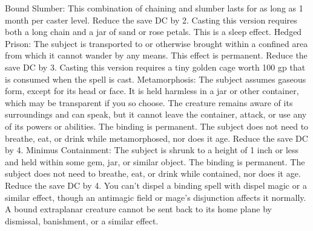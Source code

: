 {Bound Slumber: This combination of chaining and slumber lasts for as long as 1 month per caster level. Reduce the save DC by 2. Casting this version requires both a long chain and a jar of sand or rose petals. This is a sleep effect.
Hedged Prison: The subject is transported to or otherwise brought within a confined area from which it cannot wander by any means. This effect is permanent. Reduce the save DC by 3. Casting this version requires a tiny golden cage worth 100 gp that is consumed when the spell is cast.
Metamorphosis: The subject assumes gaseous form, except for its head or face. It is held harmless in a jar or other container, which may be transparent if you so choose. The creature remains aware of its surroundings and can speak, but it cannot leave the container, attack, or use any of its powers or abilities. The binding is permanent. The subject does not need to breathe, eat, or drink while metamorphosed, nor does it age. Reduce the save DC by 4.
Minimus Containment: The subject is shrunk to a height of 1 inch or less and held within some gem, jar, or similar object. The binding is permanent. The subject does not need to breathe, eat, or drink while contained, nor does it age. Reduce the save DC by 4.
You can't dispel a binding spell with dispel magic or a similar effect, though an antimagic field or mage's disjunction affects it normally. A bound extraplanar creature cannot be sent back to its home plane by dismissal, banishment, or a similar effect.}
        
